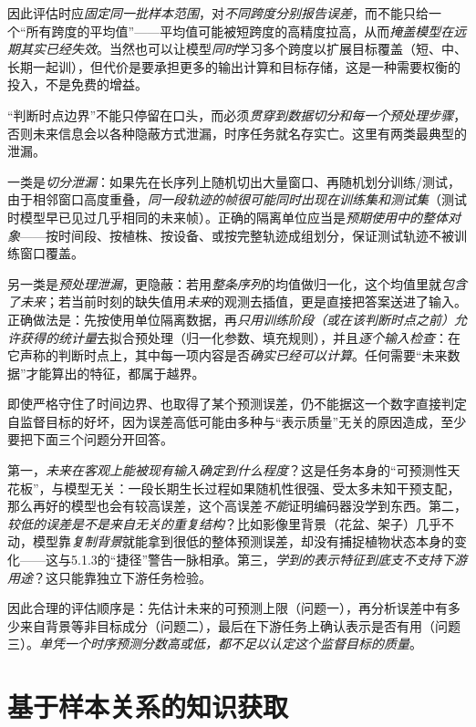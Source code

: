 因此评估时应\emph{固定同一批样本范围}，对\emph{不同跨度分别报告误差}，而不能只给一个“所有跨度的平均值”——平均值可能被短跨度的高精度拉高，从而\emph{掩盖模型在远期其实已经失效}。当然也可以让模型\emph{同时}学习多个跨度以扩展目标覆盖（短、中、长期一起训），但代价是要承担更多的输出计算和目标存储，这是一种需要权衡的投入，不是免费的增益。

“判断时点边界”不能只停留在口头，而必须\emph{贯穿到数据切分和每一个预处理步骤}，否则未来信息会以各种隐蔽方式泄漏，时序任务就名存实亡。这里有两类最典型的泄漏。

一类是\emph{切分泄漏}：如果先在长序列上随机切出大量窗口、再随机划分训练/测试，由于相邻窗口高度重叠，\emph{同一段轨迹的帧很可能同时出现在训练集和测试集}（测试时模型早已见过几乎相同的未来帧）。正确的隔离单位应当是\emph{预期使用中的整体对象}——按时间段、按植株、按设备、或按完整轨迹成组划分，保证测试轨迹不被训练窗口覆盖。

另一类是\emph{预处理泄漏}，更隐蔽：若用\emph{整条序列}的均值做归一化，这个均值里就\emph{包含了未来}；若当前时刻的缺失值用\emph{未来}的观测去插值，更是直接把答案送进了输入。正确做法是：先按使用单位隔离数据，再\emph{只用训练阶段（或在该判断时点之前）允许获得的统计量}去拟合预处理（归一化参数、填充规则），并且\emph{逐个输入检查}：在它声称的判断时点上，其中每一项内容是否\emph{确实已经可以计算}。任何需要“未来数据”才能算出的特征，都属于越界。

即使严格守住了时间边界、也取得了某个预测误差，仍不能据这一个数字直接判定自监督目标的好坏，因为误差高低可能由多种与“表示质量”无关的原因造成，至少要把下面三个问题分开回答。

第一，\emph{未来在客观上能被现有输入确定到什么程度}？这是任务本身的“可预测性天花板”，与模型无关：一段长期生长过程如果随机性很强、受太多未知干预支配，那么再好的模型也会有较高误差，这个高误差\emph{不能}证明编码器没学到东西。第二，\emph{较低的误差是不是来自无关的重复结构}？比如影像里背景（花盆、架子）几乎不动，模型靠\emph{复制背景}就能拿到很低的整体预测误差，却没有捕捉植物状态本身的变化——这与5.1.3的“捷径”警告一脉相承。第三，\emph{学到的表示特征到底支不支持下游用途}？这只能靠独立下游任务检验。

因此合理的评估顺序是：先估计未来的可预测上限（问题一），再分析误差中有多少来自背景等非目标成分（问题二），最后在下游任务上确认表示是否有用（问题三）。\emph{单凭一个时序预测分数高或低，都不足以认定这个监督目标的质量}。

\section{基于样本关系的知识获取}
\label{sec:data-derived-knowledge-relations}


